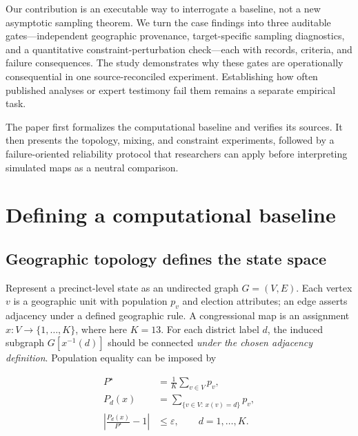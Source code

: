 \documentclass[
  10pt,
]{article}
\begin{document}
Our contribution is an executable way to interrogate a baseline, not a
new asymptotic sampling theorem. We turn the case findings into three
auditable gates---independent geographic provenance, target-specific
sampling diagnostics, and a quantitative constraint-perturbation
check---each with records, criteria, and failure consequences. The study
demonstrates why these gates are operationally consequential in one
source-reconciled experiment. Establishing how often published analyses
or expert testimony fail them remains a separate empirical task.

The paper first formalizes the computational baseline and verifies its
sources. It then presents the topology, mixing, and constraint
experiments, followed by a failure-oriented reliability protocol that
researchers can apply before interpreting simulated maps as a neutral
comparison.

\hypertarget{defining-a-computational-baseline}{%
\section{Defining a computational
baseline}\label{defining-a-computational-baseline}}

\hypertarget{geographic-topology-defines-the-state-space}{%
\subsection{Geographic topology defines the state
space}\label{geographic-topology-defines-the-state-space}}

Represent a precinct-level state as an undirected graph \(G=(V,E)\).
Each vertex \(v\) is a geographic unit with population \(p_v\) and
election attributes; an edge asserts adjacency under a defined
geographic rule. A congressional map is an assignment
\(x:V\rightarrow\{1,\ldots,K\}\), where here \(K=13\). For each district
label \(d\), the induced subgraph \(G[x^{-1}(d)]\) should be connected
\emph{under the chosen adjacency definition}. Population equality can be
imposed by

\begin{equation}
\begin{aligned}
P^{\star} &= \frac{1}{K}\sum_{v\in V}p_v, \\
P_d(x) &= \sum_{\{v\in V:\,x(v)=d\}}p_v,\\
\left|\frac{P_d(x)}{P^{\star}}-1\right| &\leq \varepsilon,
\qquad d=1,\ldots,K.
\end{aligned}
\end{equation}
\end{document}
